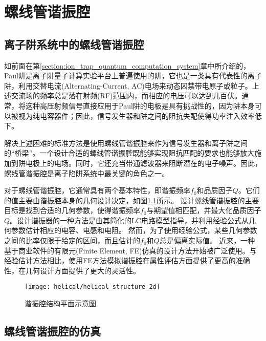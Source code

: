 
\chapter[螺线管谐振腔]{螺线管谐振腔}
\section[离子阱系统中的螺线管谐振腔]{离子阱系统中的螺线管谐振腔}

如前面在第\ref{section:ion_trap_quantum_computation_system}章中所介绍的，Paul阱是离子阱量子计算实验平台上普遍使用的阱，它也是一类具有代表性的离子阱，利用交替电流(Alternating-Current, AC)电场来动态囚禁带电原子或粒子。上述交流场的频率总是落在射频(RF)范围内，而相应的电压可以达到几百伏。通常，将这种高压射频信号直接应用于Paul阱的电极是具有挑战性的，因为阱本身可以被视为纯电容器件；因此，信号发生器和阱之间的阻抗失配使得功率注入效率低下。

解决上述困难的标准方法是使用螺线管谐振腔来作为信号发生器和离子阱之间的“桥梁”。一个设计合适的螺线管谐振腔既能够实现阻抗匹配的要求也能够放大施加到阱电极上的电场。同时，它还充当带通滤波器来阻断潜在的电子噪声。因此，螺线管谐振腔是离子陷阱系统中最关键的角色之一。

对于螺线管谐振腔，它通常具有两个基本特性，即谐振频率$f_0$和品质因子$Q$。它们的值主要由谐振腔本身的几何设计决定，如图\ref{fig:helical_structure_2d}所示。
设计螺线管谐振腔的主要目标是找到合适的几何参数，使得谐振频率$f_0$与期望值相匹配，并最大化品质因子$Q$。设计谐振器的一种方法是由其简化的LC电路模型指导，并利用经验公式从几何参数估计相应的电容、电感和电阻。
然而，为了使用经验公式，某些几何参数之间的比率仅限于给定的区间，而且估计的$f_0$和$Q$总是偏离实际值。
近来，一种基于商业软件的有限元(Finite Element, FE)仿真的设计方法开始被广泛使用。与经验估计方法相比，使用FE方法模拟谐振腔在属性评估方面提供了更高的准确性，在几何设计方面提供了更大的灵活性。

\begin{figure}
    \centering
    \caption[谐振腔结构平面示意图]{谐振腔结构平面示意图\label{fig:helical_structure_2d}}
    \texttt{[image: helical/helical\_structure\_2d]}
\end{figure}

\section[螺线管谐振腔的仿真]{螺线管谐振腔的仿真}

